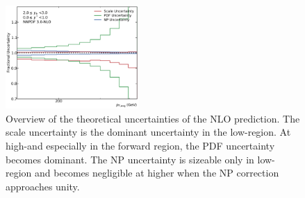 \begin{figure}[htp]
    \includegraphics[width=0.45\textwidth]{figures/theory/theo_unc_yb2ys0.pdf}
    \caption[Overview of theoretical uncertaintites]{Overview of the theoretical uncertainties of the NLO prediction.
    The scale uncertainty is the dominant uncertainty in the low-\pt region. At
    high-\pt and especially in the forward region, the PDF uncertainty becomes
    dominant. The NP uncertainty is sizeable only in low-\pt region and becomes
    negligible at higher \pt when the NP correction approaches unity.}
    \label{fig:theo_uncertainties}
\end{figure}
